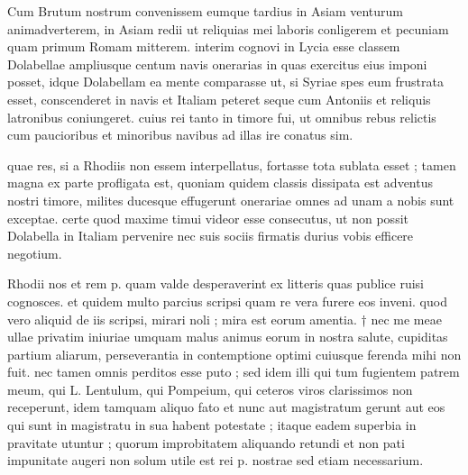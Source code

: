 


 Cum Brutum nostrum convenissem eumque tardius in Asiam venturum animadverterem, in Asiam redii ut reliquias mei laboris conligerem et pecuniam quam primum Romam mitterem. interim cognovi in Lycia esse classem Dolabellae ampliusque centum navis onerarias in quas exercitus eius imponi posset, idque Dolabellam ea mente comparasse ut, si Syriae spes eum frustrata esset, conscenderet in navis et Italiam peteret seque cum Antoniis et reliquis latronibus coniungeret. cuius rei tanto in timore fui, ut omnibus rebus relictis cum paucioribus et minoribus navibus ad illas ire conatus sim.

 quae res, si a Rhodiis non essem interpellatus, fortasse tota sublata esset ; tamen magna ex parte profligata est, quoniam quidem classis dissipata est adventus nostri timore, milites ducesque effugerunt onerariae omnes ad unam a nobis sunt exceptae. certe quod maxime timui videor esse consecutus, ut non possit Dolabella in Italiam pervenire nec suis sociis firmatis durius vobis efficere negotium.

 Rhodii nos et rem p. quam valde desperaverint ex litteris quas publice ruisi cognosces. et quidem multo parcius scripsi quam re vera furere eos inveni. quod vero aliquid de iis scripsi, mirari noli ; mira est eorum amentia. † nec me meae ullae privatim iniuriae umquam malus animus eorum in nostra salute, cupiditas partium aliarum, perseverantia in contemptione optimi cuiusque ferenda mihi non fuit. nec tamen omnis perditos esse puto ; sed idem illi qui tum fugientem patrem meum, qui L. Lentulum, qui Pompeium, qui ceteros viros clarissimos non receperunt, idem tamquam aliquo fato et nunc aut magistratum gerunt aut eos qui sunt in magistratu in sua habent potestate ; itaque eadem superbia in pravitate utuntur ; quorum improbitatem aliquando retundi et non pati impunitate augeri non solum utile est rei p. nostrae sed etiam necessarium.

